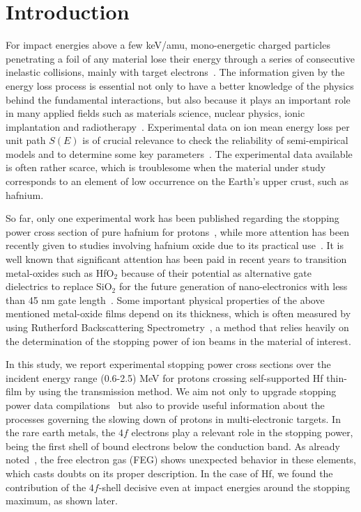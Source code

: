 \documentclass[aps,pra,reprint,groupedaddress]{revtex4-1}
\begin{document}
\section{Introduction}
\label{intro}

For impact energies above a few keV/amu, mono-energetic charged particles penetrating a foil of any material lose their energy through a series of consecutive inelastic collisions, mainly with target electrons~\cite{Chu01,Sigmund}. The information given by the energy loss process is essential not only to have a better knowledge of the physics behind the fundamental interactions, but also because it plays an important role in many applied fields such as materials science, nuclear physics, ionic implantation and radiotherapy~\cite{Sigmund,Schardt}. Experimental data on ion mean energy loss per unit path $S(E)$ is of crucial relevance to check the reliability of semi-empirical models and to determine some key parameters~\cite{Diwan,Damache04,Damache02}. The experimental data available is often rather scarce, which is troublesome when the material under study corresponds to an element of low occurrence on the Earth's upper crust, such as hafnium.

So far, only one experimental work has been published regarding the stopping power cross section of pure hafnium for protons~\cite{Sirotinin}, while more attention has been recently given to studies involving hafnium oxide due to its practical use~\cite{Abril,Behar,Primetzhofer}. It is well known that significant attention has been paid in recent years to transition metal-oxides such as HfO$_2$ because of their potential as alternative gate dielectrics to replace SiO$_2$ for the future generation of nano-electronics with less than 45 nm gate length~\cite{Choi,Robertson}.  Some important physical properties of the above mentioned metal-oxide films depend on its thickness, which is often measured by using Rutherford Backscattering Spectrometry~\cite{Alfassi01,Tesmer01}, a method that relies heavily on the determination of the stopping power of ion beams in the material of interest.

In this study, we report experimental stopping power cross sections over the incident energy range (0.6-2.5) MeV for protons crossing self-supported Hf thin-film by using the transmission method. We aim not only to upgrade stopping power data compilations~\cite{HPaul03,mondim17} but also to provide useful information about the processes governing the slowing down of protons in multi-electronic targets. In the rare earth metals, the $4f$ electrons play a relevant role in the stopping power, being the first shell of bound electrons below the conduction band. As already noted~\cite{Roth17}, the free electron gas (FEG) shows unexpected %
behavior in these elements, which casts %
doubts on its proper description. In the case of Hf, we found the contribution of the $4f$-shell decisive even at impact energies around the stopping maximum, as shown later.
\end{document}
